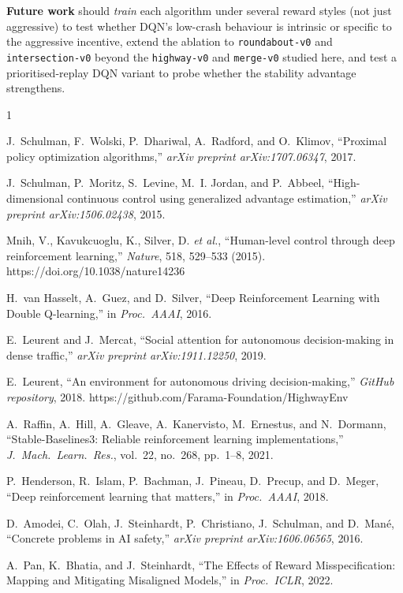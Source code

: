 \documentclass[conference]{IEEEtran}
\newcommand{\code}[1]{\texttt{#1}}
\begin{document}
\textbf{Future work} should \emph{train} each algorithm under several reward
styles (not just aggressive) to test whether DQN's low-crash behaviour is
intrinsic or specific to the aggressive incentive, extend the ablation to
\code{roundabout-v0} and \code{intersection-v0} beyond the \code{highway-v0} and
\code{merge-v0} studied here, and test a prioritised-replay DQN variant to probe
whether the stability advantage strengthens.

\begin{thebibliography}{1}

J.~Schulman, F.~Wolski, P.~Dhariwal, A.~Radford, and O.~Klimov,
``Proximal policy optimization algorithms,''
\emph{arXiv preprint arXiv:1707.06347}, 2017.

J.~Schulman, P.~Moritz, S.~Levine, M.~I. Jordan, and P.~Abbeel,
``High-dimensional continuous control using generalized advantage estimation,''
\emph{arXiv preprint arXiv:1506.02438}, 2015.

Mnih, V., Kavukcuoglu, K., Silver, D. \emph{et al.},
``Human-level control through deep reinforcement learning,''
\emph{Nature}, 518, 529–533 (2015). https://doi.org/10.1038/nature14236

H.~van Hasselt, A.~Guez, and D.~Silver,
``Deep Reinforcement Learning with Double Q-learning,''
in \emph{Proc.\ AAAI}, 2016.

E.~Leurent and J.~Mercat,
``Social attention for autonomous decision-making in dense traffic,''
\emph{arXiv preprint arXiv:1911.12250}, 2019.

E.~Leurent,
``An environment for autonomous driving decision-making,''
\emph{GitHub repository}, 2018. https://github.com/Farama-Foundation/HighwayEnv

A.~Raffin, A.~Hill, A.~Gleave, A.~Kanervisto, M.~Ernestus, and N.~Dormann,
``Stable-Baselines3: Reliable reinforcement learning implementations,''
\emph{J.\ Mach.\ Learn.\ Res.}, vol.\ 22, no.\ 268, pp.\ 1--8, 2021.

P.~Henderson, R.~Islam, P.~Bachman, J.~Pineau, D.~Precup, and D.~Meger,
``Deep reinforcement learning that matters,''
in \emph{Proc.\ AAAI}, 2018.

D.~Amodei, C.~Olah, J.~Steinhardt, P.~Christiano, J.~Schulman, and D.~Man\'e,
``Concrete problems in AI safety,''
\emph{arXiv preprint arXiv:1606.06565}, 2016.

A.~Pan, K.~Bhatia, and J.~Steinhardt,
``The Effects of Reward Misspecification: Mapping and Mitigating Misaligned Models,''
in \emph{Proc.\ ICLR}, 2022.

\end{thebibliography}
\end{document}
